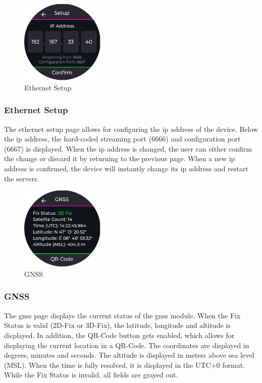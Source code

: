 \begin{minipage}{\linewidth}
	\begin{figure}
		\vspace{-0.6cm}
		\includegraphics[width=4cm]{images/6_design_final/gui/05_ethernet_config.png}
		\centering
		\caption{Ethernet Setup}
		\label{fig:final_design_gui_ethernet_setup}
	\end{figure}
	\subsubsection{Ethernet Setup}
	The ethernet setup page allows for configuring the \acrshort{ip} address  of the device.
	Below the \acrshort{ip} address, the hard-coded streaming port (6666) and configuration port (6667) is displayed.
	When the \acrshort{ip} address is changed, the user can either confirm the change or discard it by returning to the previous page.
	When a new \acrshort{ip} address is confirmed, the device will instantly change its \acrshort{ip} address and restart the servers.
\end{minipage}
\vspace{0.0cm}

\begin{minipage}{\linewidth}
	\begin{figure}
		\vspace{-0.6cm}
		\includegraphics[width=4cm]{images/6_design_final/gui/06_gnss.png}
		\centering
		\caption{GNSS}
		\label{fig:final_design_gui_gnss}
	\end{figure}
	\subsubsection{GNSS}
	The \acrshort{gnss} page displays the current status of the \acrshort{gnss} module.
	When the Fix Status is valid (2D-Fix or 3D-Fix), the latitude, longitude and altitude is displayed.
	In addition, the QR-Code button gets enabled, which allows for displaying the current location in a QR-Code.
	The coordinates are displayed in degrees, minutes and seconds.
	The altitude is displayed in meters above sea level (MSL).
	When the time is fully resolved, it is displayed in the UTC+0 format.
	While the Fix Status is invalid, all fields are grayed out.
\end{minipage}
\vspace{0.0cm}

